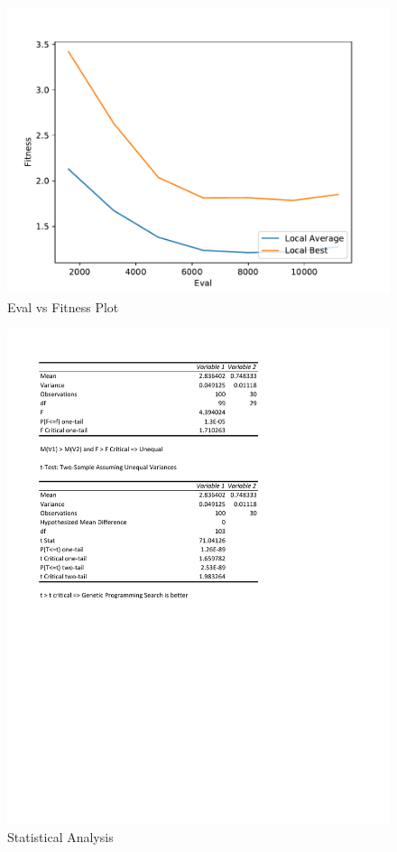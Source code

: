\documentclass[times]{article}
\begin{document}
	\begin{figure}
		\caption{Eval vs Fitness Plot}
		\label{fig:plot}
		\includegraphics[width=\textwidth]{../graph/graphs/0.pdf}
	\end{figure}

	\begin{figure}
		\caption{Statistical Analysis}
		\label{fig:stat}
		\includegraphics[width=\textwidth]{./pictures/test.pdf}
	\end{figure}


		
\end{document}
